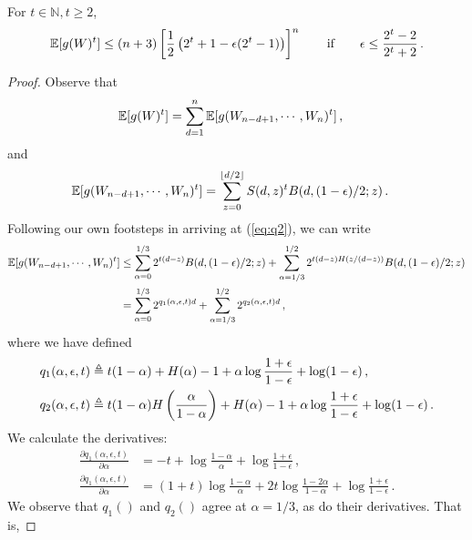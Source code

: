 \begin{proposition}\label{prop:grinding-power-moment}
For $t \in \mathbb{N}, t \geq 2$,
\[
\operatorname{\mathbb{E}}[ g(W)^t ] 
\leq 
(n+3)\left[\frac{1}{2}\left( 2^t + 1 - \epsilon (2^t -1) \right)\right]^n 
\qquad \text{if} \qquad \epsilon \leq \frac{2^t - 2}{2^t + 2}\, .
\]
\end{proposition}
\begin{proof}
Observe that
\begin{align*}
\operatorname{\mathbb{E}}[ g(W)^t ]
&= \sum_{d = 1}^n{ \operatorname{\mathbb{E}}[ g(W_{n-d+1}, \cdots, W_n)^t ] }\, ,
\end{align*}
and
\begin{align*}
\operatorname{\mathbb{E}}[ g(W_{n-d+1}, \cdots, W_n)^t ] 
&= \sum_{z = 0}^{\lfloor d/2 \rfloor} {S(d,z)^t  B(d, (1-\epsilon)/2; z) } \, .
\end{align*}
Following our own footsteps in arriving at (\ref{eq:q2}), we can write
\begin{align*}
\operatorname{\mathbb{E}}[ g(W_{n-d+1}, \cdots, W_n)^t ] 
&\leq \sum_{\alpha=0}^{1/3}{2^{t(d-z)} B(d, (1-\epsilon)/2; z) } 
+ \sum_{\alpha=1/3}^{1/2}{2^{t(d-z)H(z/(d-z))} B(d, (1-\epsilon)/2; z) } \\
&= \sum_{\alpha=0}^{1/3}{2^{q_1(\alpha, \epsilon, t)d}} 
+ \sum_{\alpha=1/3}^{1/2}{2^{q_2(\alpha, \epsilon, t)d}} \, ,
\end{align*}
where we have defined
\begin{align} 
q_1(\alpha, \epsilon, t)
& \triangleq t(1-\alpha) +
H(\alpha) 
-1  + \alpha \log \frac{1+\epsilon}{1-\epsilon} + \log (1-\epsilon) \label{eq:q1t} \, ,\\
q_2(\alpha, \epsilon, t)
& \triangleq t(1-\alpha) H\left( \frac{\alpha}{1-\alpha} \right) +
H(\alpha) 
-1  + \alpha \log \frac{1+\epsilon}{1-\epsilon} + \log (1-\epsilon) \label{eq:q2t}\, .
\end{align}
We calculate the derivatives:
\begin{align*}
\frac{\partial q_1(\alpha, \epsilon, t)}{\partial \alpha}
&= -t 
+ \log \frac{1-\alpha}{\alpha}
+ \log \frac{1+\epsilon}{1-\epsilon} \, ,
\\
\frac{\partial q_1(\alpha, \epsilon, t)}{\partial \alpha}
&= 
(1+t) \log \frac{1-\alpha}{\alpha} 
+ 2 t \log \frac{1 - 2 \alpha}{1 - \alpha}
+ \log \frac{1+\epsilon}{1-\epsilon} \, .
\end{align*}
We observe that $q_1()$ and $q_2()$ agree at $\alpha = 1/3$, as do their derivatives. That is,

\end{proof}

